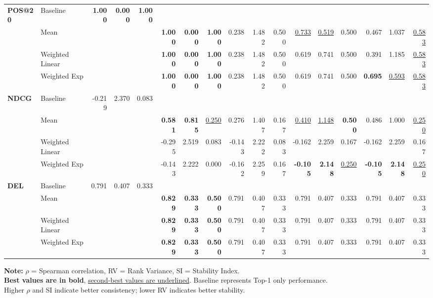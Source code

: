 \documentclass{article}
\begin{document}
\begin{table}[htbp]
\begin{tabular}{@{}llrrr|rrr|rrr|rrr|rrr@{}}
\multirow{4}{*}{\textbf{POS@20}} 
& Baseline & \textbf{1.000} & \textbf{0.000} & \textbf{1.000} & & & & & & & & & & & & \\
& Mean & & & & \textbf{1.000} & \textbf{0.000} & \textbf{1.000} & 0.238 & 1.482 & 0.500 & \uline{0.733} & \uline{0.519} & 0.500 & 0.467 & 1.037 & \uline{0.583} \\
& Weighted Linear & & & & \textbf{1.000} & \textbf{0.000} & \textbf{1.000} & 0.238 & 1.482 & 0.500 & 0.619 & 0.741 & 0.500 & 0.391 & 1.185 & \uline{0.583} \\
& Weighted Exp & & & & \textbf{1.000} & \textbf{0.000} & \textbf{1.000} & 0.238 & 1.482 & 0.500 & 0.619 & 0.741 & 0.500 & \textbf{0.695} & \uline{0.593} & \uline{0.583} \\
\midrule

\multirow{4}{*}{\textbf{NDCG}} 
& Baseline & -0.219 & 2.370 & 0.083 & & & & & & & & & & & & \\
& Mean & & & & \textbf{0.581} & \textbf{0.815} & \uline{0.250} & 0.276 & 1.407 & 0.167 & \uline{0.410} & \uline{1.148} & \textbf{0.500} & 0.486 & 1.000 & \uline{0.250} \\
& Weighted Linear & & & & -0.295 & 2.519 & 0.083 & -0.143 & 2.222 & 0.083 & -0.162 & 2.259 & 0.167 & -0.162 & 2.259 & 0.167 \\
& Weighted Exp & & & & -0.143 & 2.222 & 0.000 & -0.162 & 2.259 & 0.167 & \textbf{-0.105} & \textbf{2.148} & \uline{0.250} & \textbf{-0.105} & \textbf{2.148} & \uline{0.250} \\
\midrule

\multirow{4}{*}{\textbf{DEL}} 
& Baseline & 0.791 & 0.407 & 0.333 & & & & & & & & & & & & \\
& Mean & & & & \textbf{0.829} & \textbf{0.333} & \textbf{0.500} & 0.791 & 0.407 & 0.333 & 0.791 & 0.407 & 0.333 & 0.791 & 0.407 & 0.333 \\
& Weighted Linear & & & & \textbf{0.829} & \textbf{0.333} & \textbf{0.500} & 0.791 & 0.407 & 0.333 & 0.791 & 0.407 & 0.333 & 0.791 & 0.407 & 0.333 \\
& Weighted Exp & & & & \textbf{0.829} & \textbf{0.333} & \textbf{0.500} & 0.791 & 0.407 & 0.333 & 0.791 & 0.407 & 0.333 & 0.791 & 0.407 & 0.333 \\

\bottomrule
\end{tabular}
\begin{flushleft}
\textbf{Note:} $\rho$ = Spearman correlation, RV = Rank Variance, SI = Stability Index. \\
\textbf{Best values are in bold}, \uline{second-best values are underlined}. Baseline represents Top-1 only performance. \\
Higher $\rho$ and SI indicate better consistency; lower RV indicates better stability.
\end{flushleft}
\end{table}
\end{document}
